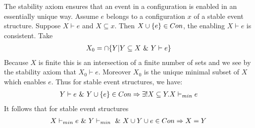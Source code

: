 \documentclass{article}
\begin{document}
The stability axiom ensures that an event in a configuration is
enabled in an essentially unique way.
Assume $e$ belongs to a configuration $x$ of a stable event structure.
Suppose $X \vdash e$ and $X \subseteq x$.
Then $X \cup \{e\} \in Con$, the enabling $X\vdash e$ is consistent.
Take
\begin{align*}
    X_0 = \cap \{Y | Y \subseteq X \ \& \  Y \vdash e\}
\end{align*}
Because $X$ is finite this is an intersection of a finite number of
sets and we see by the stability axiom that $X_0 \vdash e$.
Moreover $X_0$ is the unique minimal subset of $X$ which enables $e$.
Thus for stable event structures, we have:
\begin{align*}
    Y \vdash e \ \& \  Y \cup \{e\} \in Con \Rightarrow
    \exists ! X \subseteq Y.X \vdash_{min} e
\end{align*}
It follows that for stable event structures
\begin{align*}
    X \vdash_{min} e \ \& \  Y \vdash_{min} \ \& \ 
    X \cup Y \cup e \in Con \Rightarrow X = Y
\end{align*}
\end{document}
